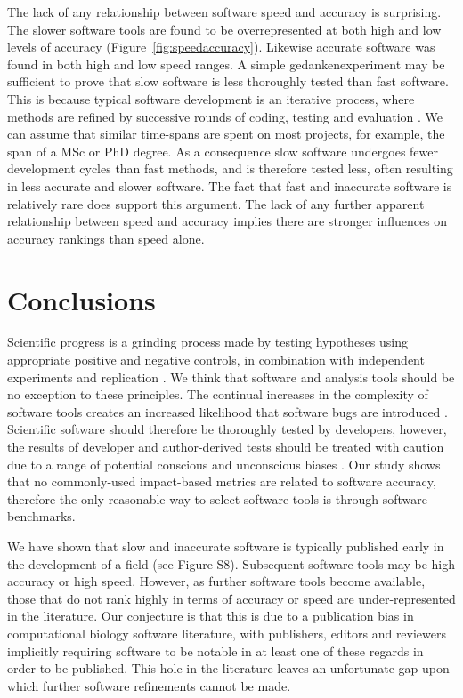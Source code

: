 \documentclass[fleqn,10pt]{SelfArx} %
\begin{document}
The lack of any relationship between software speed and accuracy is surprising. 
The slower software tools are found to be overrepresented at both high and low levels of accuracy (Figure~\ref{fig:speedaccuracy}). Likewise accurate software was found in both high and low speed ranges. A simple gedankenexperiment may be sufficient to prove that slow software is less thoroughly tested than fast software. This is because typical software development is an iterative process, where methods are refined by successive rounds of coding, testing and evaluation \cite{Wilson2006-ih}. We can assume that similar time-spans are spent on most projects, for example, the span of a MSc or PhD degree.  As a consequence slow software undergoes fewer development cycles than fast methods, and is therefore tested less, often resulting in less accurate and slower software. The fact that fast and inaccurate software is relatively rare does support this argument. The lack of any further apparent relationship between speed and accuracy implies there are stronger influences on accuracy rankings than speed alone.

\section*{Conclusions}
Scientific progress is a grinding process made by testing hypotheses using appropriate positive and negative controls, in combination with independent experiments and replication \cite{Ioannidis2005-xh,Moonesinghe2007-kk}. We think that software and analysis tools should be no exception to these principles. The continual increases in the complexity of software tools creates an increased likelihood that software bugs are introduced \cite{Darriba2015-sz}. Scientific software should therefore be thoroughly tested by developers, however, the results of developer and author-derived tests should be treated with caution due to a range of potential conscious and unconscious biases \cite{Norel2011-cq}. Our study shows that no commonly-used impact-based metrics are related to software accuracy, therefore the only reasonable way to select software tools is through software benchmarks.

We have shown that slow and inaccurate software is typically published early in the development of a field (see Figure S8). Subsequent software tools may be high accuracy or high speed. However, as further software tools become available, those that do not rank highly in terms of accuracy or speed are under-represented in the literature. Our conjecture is that this is due to a publication bias in computational biology software literature, with publishers, editors and reviewers implicitly requiring software to be notable in at least one of these regards in order to be published. This hole in the literature leaves an unfortunate gap upon which further software refinements cannot be made. 
\end{document}
